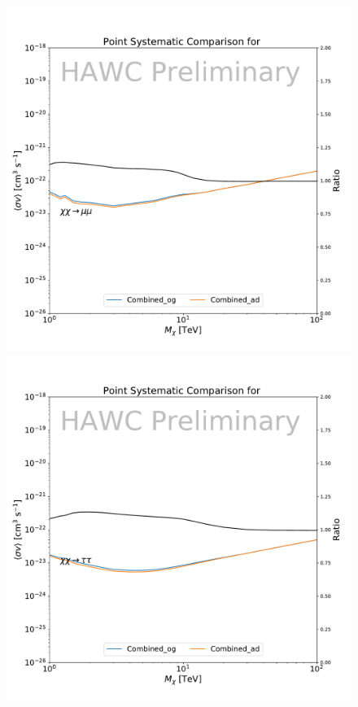 \begin{figure}[h]
{    \includegraphics[scale=0.21]{figures/glory_duck/hawc/PointingSystematic_GD_Combined_mumu.pdf}
    \includegraphics[scale=0.21]{figures/glory_duck/hawc/PointingSystematic_GD_Combined_tautau.pdf}
}
\end{figure}
